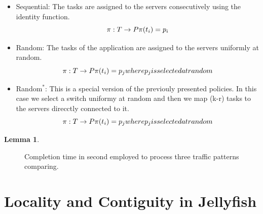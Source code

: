 \documentclass{sig-alternate}
\newtheorem{lemma}{Lemma}
\begin{document}
\begin{itemize}
    \item Sequential: The tasks are assigned to the servers consecutively using the identity function.
        \begin{equation}
            \pi:T \rightarrow P\\
            \pi(t_i)=p_i
        \end{equation}
    \item Random: The tasks of the application are assigned to the servers uniformly at random.
        \begin{equation}
            \pi:T \rightarrow P\\
            \pi(t_i)=p_j where p_j is selected at random
        \end{equation}
    \item Random$^*$: This is a special version of the previouly presented policies. In this case we select a switch uniformy at random and then we map (k-r) tasks to the servers direcctly connected to it. 
        \begin{equation}
            \pi:T \rightarrow P\\
            \pi(t_i)=p_j where p_j is selected at random
        \end{equation}
\end{itemize}

\begin{lemma}

\end{lemma}



\begin{figure}[t]
  \begin{tikzpicture}
         
  \end{tikzpicture}
  \caption{Completion time in second employed to process three traffic patterns comparing.}
\label{fig:plot-dynamic}
\end{figure}


\section{Locality and Contiguity in Jellyfish}
\label{locality}
\end{document}
